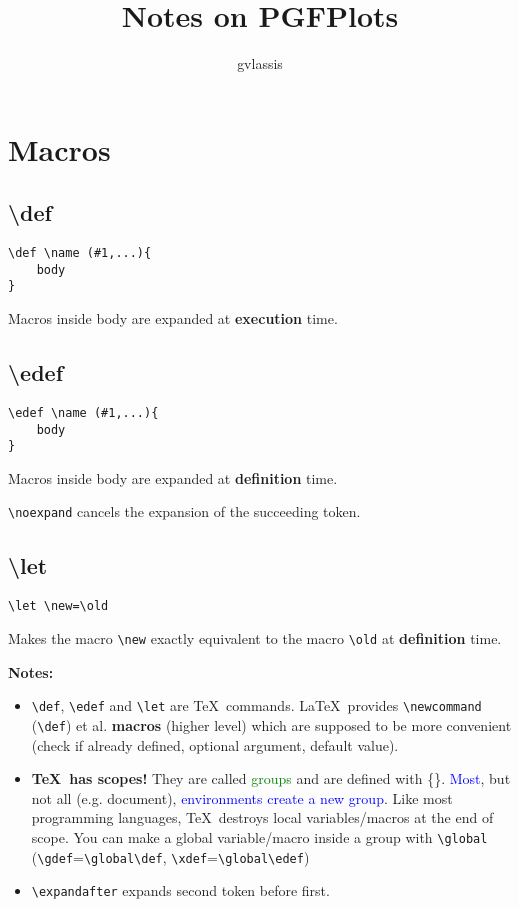\documentclass{article}
\title{Notes on PGFPlots}
\author{gvlassis}
\date{}
\begin{document}
\maketitle

\section{Macros}
\subsection{\textbackslash def}
\begin{lstlisting}
\def \name (#1,...){
    body
}
\end{lstlisting}
Macros inside body are expanded at \textbf{execution} time.

\subsection{\textbackslash edef}
\begin{lstlisting}
\edef \name (#1,...){
    body
}
\end{lstlisting}
Macros inside body are expanded at \textbf{definition} time.

\lstinline!\noexpand! cancels the expansion of the succeeding token.

\subsection{\textbackslash let}
\begin{lstlisting}
\let \new=\old
\end{lstlisting}
Makes the macro \lstinline!\new! exactly equivalent to the macro \lstinline!\old! at \textbf{definition} time.

{\large\textbf{Notes:}}
\begin{itemize}
    \item \lstinline!\def!, \lstinline!\edef! and \lstinline!\let! are \TeX\ commands. \LaTeX\ provides \lstinline!\newcommand! (\propto \lstinline!\def!) et al. \textbf{macros} (higher level) which are supposed to be more convenient (check if already defined, optional argument, default value). 
    \item \textbf{\TeX\ has scopes!} They are called \textcolor{green}{groups} and are defined with \{\}. \textcolor{blue}{Most}, but not all (e.g. document), \textcolor{blue}{environments create a new group}. Like most programming languages, \TeX\ destroys local variables/macros at the end of scope. You can make a global variable/macro inside a group with \lstinline!\global! (\lstinline!\gdef!=\lstinline!\global\def!, \lstinline!\xdef!=\lstinline!\global\edef!)
    \item \lstinline!\expandafter! expands second token before first.
\end{itemize}
\end{document}
